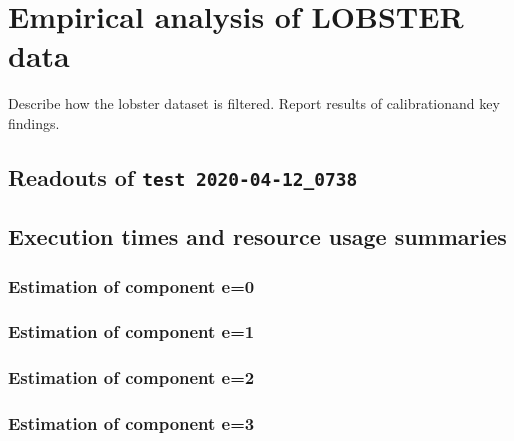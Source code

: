 \documentclass[10pt, article,table]{article}
\begin{document}
\section{Empirical analysis of LOBSTER data}
Describe how the lobster dataset is filtered. Report results of calibrationand key findings. 


\newpage


    

\newpage


\begin{appendices}
\section{Readouts of \texttt{test 2020-04-12\_0738}}
\subsection{Execution times and resource usage summaries}
\subsubsection{Estimation of component e=0}
 \begin{tcolorbox}[breakable, size=fbox, boxrule=1pt, pad at break*=1mm,colframe=cellborder]    
 
\end{tcolorbox}
\subsubsection{Estimation of component e=1}
\begin{tcolorbox}[breakable, size=fbox, boxrule=1pt, pad at break*=1mm,colframe=cellborder]    
 
\end{tcolorbox}
\subsubsection{Estimation of component e=2}
 \begin{tcolorbox}[breakable, size=fbox, boxrule=1pt, pad at break*=1mm,colframe=cellborder]    
 
\end{tcolorbox}
\subsubsection{Estimation of component e=3}
 \begin{tcolorbox}[breakable, size=fbox, boxrule=1pt, pad at break*=1mm,colframe=cellborder]    
 
\end{tcolorbox}
\end{appendices}
\end{document}
